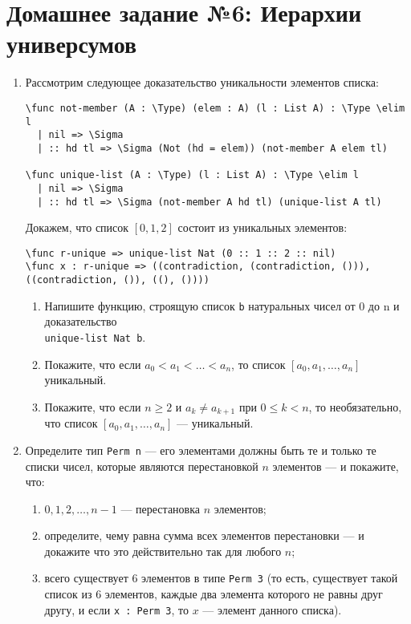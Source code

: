\documentclass[10pt,a4paper,oneside]{article}
\begin{document}
\section*{Домашнее задание №6: Иерархии универсумов}
\begin{enumerate}

\item Рассмотрим следующее доказательство уникальности элементов списка:
\begin{verbatim}
\func not-member (A : \Type) (elem : A) (l : List A) : \Type \elim l
  | nil => \Sigma
  | :: hd tl => \Sigma (Not (hd = elem)) (not-member A elem tl)

\func unique-list (A : \Type) (l : List A) : \Type \elim l
  | nil => \Sigma
  | :: hd tl => \Sigma (not-member A hd tl) (unique-list A tl)
\end{verbatim}

Докажем, что список $[0,1,2]$ состоит из уникальных элементов:
\begin{verbatim}
\func r-unique => unique-list Nat (0 :: 1 :: 2 :: nil)
\func x : r-unique => ((contradiction, (contradiction, ())), ((contradiction, ()), ((), ())))
\end{verbatim}

\begin{enumerate} 
\item Напишите функцию, строящую список \verb!b! натуральных чисел от 0 до n и доказательство\\ \verb!unique-list Nat b!.
\item Покажите, что если $a_0 < a_1 < \dots < a_n$, то список $[a_0,a_1,\dots,a_n]$ уникальный.
\item Покажите, что если $n \ge 2$ и $a_k \ne a_{k+1}$ при $0 \le k < n$, то необязательно, что список
$[a_0,a_1,\dots,a_n]$ --- уникальный.
\end{enumerate}

\item Определите тип \verb!Perm n! --- его элементами должны быть те и только те списки чисел, которые являются перестановкой
$n$ элементов --- и покажите, что:
\begin{enumerate}
\item $0,1,2,\dots,n-1$ --- перестановка $n$ элементов;
\item определите, чему равна сумма всех элементов перестановки --- и докажите что это действительно так для любого $n$;
\item всего существует $6$ элементов в типе \verb!Perm 3! (то есть, существует такой список из 6 элементов,
каждые два элемента которого не равны друг другу, и если \verb!x : Perm 3!, то $x$ --- элемент данного списка).
\end{enumerate}


\end{enumerate}
\end{document}
